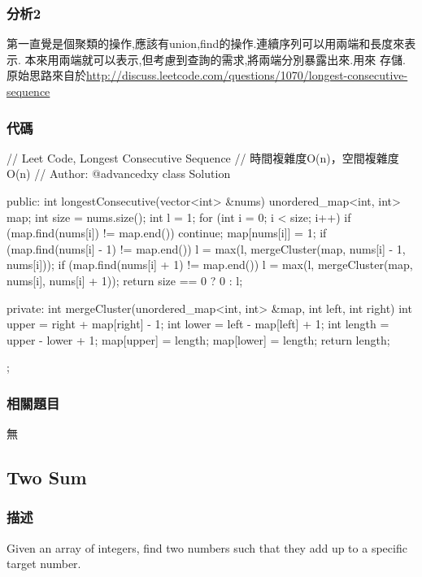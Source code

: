 \subsubsection{分析2}
第一直覺是個聚類的操作,應該有union,find的操作.連續序列可以用兩端和長度來表示.
本來用兩端就可以表示,但考慮到查詢的需求,將兩端分別暴露出來.用來
存儲.原始思路來自於\url{http://discuss.leetcode.com/questions/1070/longest-consecutive-sequence}

\subsubsection{代碼}

\begin{Code}
// Leet Code, Longest Consecutive Sequence
// 時間複雜度O(n)，空間複雜度O(n)
// Author: @advancedxy
class Solution {
public:
    int longestConsecutive(vector<int> &nums) {
        unordered_map<int, int> map;
        int size = nums.size();
        int l = 1;
        for (int i = 0; i < size; i++) {
            if (map.find(nums[i]) != map.end()) continue;
            map[nums[i]] = 1;
            if (map.find(nums[i] - 1) != map.end()) {
                l = max(l, mergeCluster(map, nums[i] - 1, nums[i]));
            }
            if (map.find(nums[i] + 1) != map.end()) {
                l = max(l, mergeCluster(map, nums[i], nums[i] + 1));
            }
        }
        return size == 0 ? 0 : l;
    }

private:
    int mergeCluster(unordered_map<int, int> &map, int left, int right) {
        int upper = right + map[right] - 1;
        int lower = left - map[left] + 1;
        int length = upper - lower + 1;
        map[upper] = length;
        map[lower] = length;
        return length;
    }
};
\end{Code}

\subsubsection{相關題目}
\begindot
\item 無
\myenddot


\subsection{Two Sum} %
\label{sec:Two-sum}


\subsubsection{描述}
Given an array of integers, find two numbers such that they add up to a specific target number.

